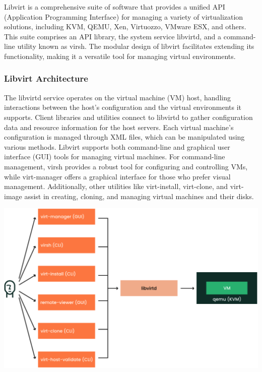 Libvirt is a comprehensive suite of software that provides a unified API (Application Programming Interface) for managing a variety of virtualization solutions, including KVM, QEMU, Xen, Virtuozzo, VMware ESX, and others. This suite comprises an API library, the system service libvirtd, and a command-line utility known as virsh. The modular design of libvirt facilitates extending its functionality, making it a versatile tool for managing virtual environments.

\subsubsection[Libvirt Architecture]{Libvirt Architecture}
The libvirtd service operates on the virtual machine (VM) host, handling interactions between the host's configuration and the virtual environments it supports. Client libraries and utilities connect to libvirtd to gather configuration data and resource information for the host servers. Each virtual machine's configuration is managed through XML files, which can be manipulated using various methods.
Libvirt supports both command-line and graphical user interface (GUI) tools for managing virtual machines. For command-line management, virsh provides a robust tool for configuring and controlling VMs, while virt-manager offers a graphical interface for those who prefer visual management. Additionally, other utilities like virt-install, virt-clone, and virt-image assist in creating, cloning, and managing virtual machines and their disks.
\begin{center}
    \centering
    \includegraphics[width=1\textwidth]{Images/Libvirt Overview.png}
     \cite{Libvirt}
    \label{fig:libvirt}
\end{center}
\noindent
\mynewline

